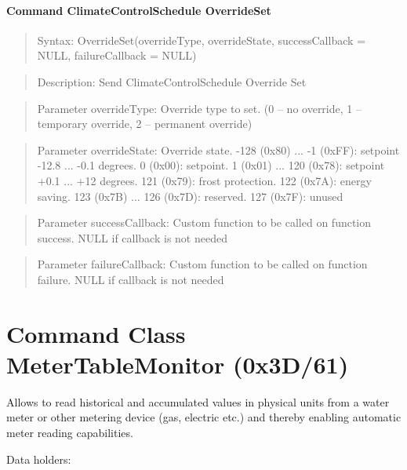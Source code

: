\paragraph{Command ClimateControlSchedule OverrideSet}
\begin{quote}Syntax: OverrideSet(overrideType, overrideState, successCallback = NULL, failureCallback = NULL)\end{quote}
\begin{quote}Description: Send ClimateControlSchedule Override Set\end{quote}
\begin{quote}Parameter overrideType: Override type to set. (0 – no override, 1 – temporary override, 2 – permanent override)\end{quote}
\begin{quote}Parameter overrideState: Override state. -128 (0x80) ... -1 (0xFF): setpoint -12.8 ... -0.1 degrees. 0 (0x00): setpoint. 1 (0x01) ... 120 (0x78): setpoint +0.1 ... +12 degrees. 121 (0x79): frost protection. 122 (0x7A): energy saving. 123 (0x7B) ... 126 (0x7D): reserved. 127 (0x7F): unused\end{quote}
\begin{quote}Parameter successCallback: Custom function to be called on function success. NULL if callback is not needed\end{quote}
\begin{quote}Parameter failureCallback: Custom function to be called on function failure. NULL if callback is not needed\end{quote}



\section{Command Class MeterTableMonitor (0x3D/61)}

Allows to read historical and accumulated values in physical units from a water meter or other metering device (gas, electric etc.) and thereby enabling automatic meter reading capabilities.
\newline

\noindent
Data holders:

